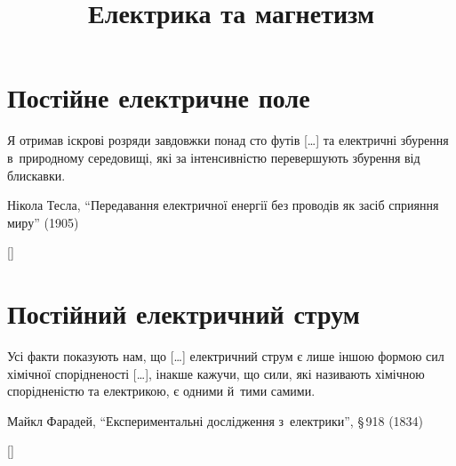 \documentclass[biblatex]{ConspectBook}
\title{Електрика та магнетизм}
\begin{document}
\pagestyle{empty}
\CoverPage
\maketitle
\makeinfopage
%
\clearpage\pagestyle{plain}
{}
\tableofcontents%
%

%
%

%
%
%


\clearpage
\pagestyle{main}

\part{Постійне електричне поле}
\label{part:SteadyElectricField}
\gdef\currentparttitle{Постійне електричне поле}
\epigraph{\Alexander Я отримав іскрові розряди завдовжки понад сто футів [\ldots] та електричні збурення в~природному середовищі, які за інтенсивністю перевершують збурення від блискавки.}{Нікола Тесла, \enquote{Передавання електричної енергії без проводів як засіб сприяння миру} (1905)}
[]

\part{Постійний електричний струм}
\label{part:SteadyCurrent}
\gdef\currentparttitle{Постійний електричний струм}
\epigraph{\Alexander Усі факти показують нам, що [\ldots] електричний струм є лише іншою формою сил хімічної спорідненості [\ldots], інакше кажучи, що сили, які називають хімічною спорідненістю та електрикою, є одними й~тими самими.}{Майкл Фарадей, \enquote{Експериментальні дослідження з~електрики}, \S\,918 (1834)}
[]
\end{document}

